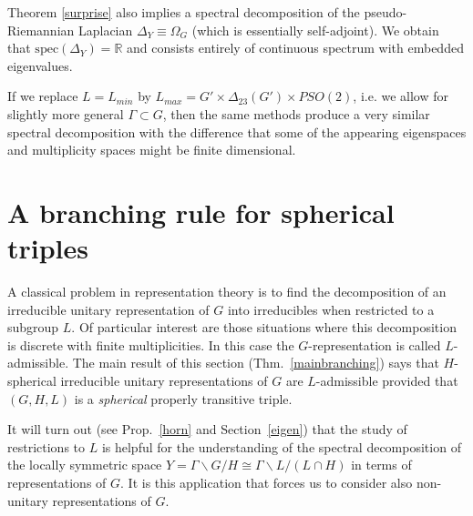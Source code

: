 \documentclass[10]{amsart}
\theoremstyle{remark}
\theoremstyle{definition}
\numberwithin{equation}{section}
\newcommand{\R}{\mathbb{R}}           %
\newcommand{\spec}{{\mathrm{spec}}}
\begin{document}
{Theorem \ref{surprise} also implies a spectral decomposition of the pseudo-Riemannian Laplacian $\Delta_Y\equiv \Omega_G$ (which is essentially self-adjoint). We obtain that
$\spec(\Delta_Y)=\R$ and consists entirely of continuous spectrum with embedded eigenvalues.

If we replace $L=L_{min}$ by $L_{max}=G'\times\Delta_{23}(G')\times PSO(2)$, i.e. we allow for slightly more general $\Gamma\subset G$, then the same methods produce
a very similar spectral decomposition with the difference that some of the appearing eigenspaces and multiplicity spaces might be finite dimensional.








\section{A branching rule for spherical triples}\label{branching}

A classical problem in representation theory is to find the decomposition of  an irreducible unitary representation of $G$ into irreducibles when restricted to a subgroup $L$.
Of particular interest are those situations where this decomposition is discrete with finite multiplicities. In this case the $G$-representation is called $L$-admissible. The main result
of this section (Thm.~\ref{mainbranching}) says that $H$-spherical irreducible unitary representations of $G$ are $L$-admissible provided that $(G,H,L)$ is a {\em spherical} properly transitive triple.

It will turn out (see Prop.~\ref{horn} and Section~\ref{eigen}) that the study of restrictions to $L$ is helpful for the understanding of the spectral decomposition of
the locally symmetric space $Y=\Gamma\backslash G/H\cong \Gamma\backslash L/(L\cap H)$ in terms of representations of $G$. It is this application that forces us to consider also
non-unitary representations of $G$.   

}
\end{document}
